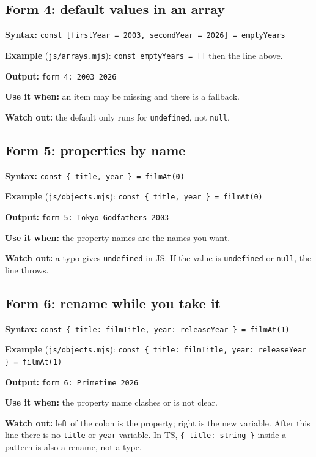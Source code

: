 \documentclass[
  11pt,
]{article}
\begin{document}
\subsection{Form 4: default values in an
array}\label{form-4-default-values-in-an-array}

\textbf{Syntax:}
\texttt{const [firstYear = 2003, secondYear = 2026] = emptyYears}

\textbf{Example} (\texttt{js/arrays.mjs}):
\texttt{const emptyYears = []} then the line above.

\textbf{Output:} \texttt{form 4: 2003 2026}

\textbf{Use it when:} an item may be missing and there is a fallback.

\textbf{Watch out:} the default only runs for
\texttt{undefined}, not \texttt{null}.

\subsection{Form 5: properties by name}\label{form-5-properties-by-name}

\textbf{Syntax:}
\texttt{const \{ title, year \} = filmAt(0)}

\textbf{Example} (\texttt{js/objects.mjs}):
\texttt{const \{ title, year \} = filmAt(0)}

\textbf{Output:} \texttt{form 5: Tokyo Godfathers 2003}

\textbf{Use it when:} the property names are the names you want.

\textbf{Watch out:} a typo gives \texttt{undefined} in
JS. If the value is \texttt{undefined} or
\texttt{null}, the line throws.

\subsection{Form 6: rename while you take
it}\label{form-6-rename-while-you-take-it}

\textbf{Syntax:}
\texttt{const \{ title: filmTitle, year: releaseYear \} = filmAt(1)}

\textbf{Example} (\texttt{js/objects.mjs}):
\texttt{const \{ title: filmTitle, year: releaseYear \} = filmAt(1)}

\textbf{Output:} \texttt{form 6: Primetime 2026}

\textbf{Use it when:} the property name clashes or is not clear.

\textbf{Watch out:} left of the colon is the property; right is the new
variable. After this line there is no \texttt{title} or
\texttt{year} variable. In TS,
\texttt{\{ title: string \}} inside a pattern is also a
rename, not a type.
\end{document}

